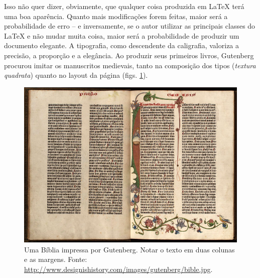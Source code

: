 \documentclass[a4paper,numbers=noenddot,abstract,DIV=calc]{scrbook} %
\begin{document}
Isso não quer dizer, obviamente, que qualquer coisa produzida em \LaTeX{} terá uma boa aparência. Quanto mais modificações forem feitas, maior será a probabilidade de erro -- e inversamente, se o autor utilizar as principais classes do \LaTeX{} e não mudar muita coisa, maior será a probabilidade de produzir um documento elegante. A tipografia, como descendente da caligrafia, valoriza a precisão, a proporção e a elegância. Ao produzir seus primeiros livros, Gutenberg procurou imitar os manuscritos medievais, tanto na composição dos tipos (\textit{textura quadrata}) quanto no layout da página (figs. \ref{fig:biblia-gutenberg}). 



\begin{figure}
\centering
\includegraphics[width=0.8\linewidth]{biblia-gutenberg}
\caption[Uma Bíblia impressa por Gutenberg.]{Uma Bíblia impressa por Gutenberg. Notar o texto em duas colunas e as margens. Fonte: \url{http://www.designishistory.com/images/gutenberg/bible.jpg}.\label{fig:biblia-gutenberg}}
\end{figure}
\end{document}
